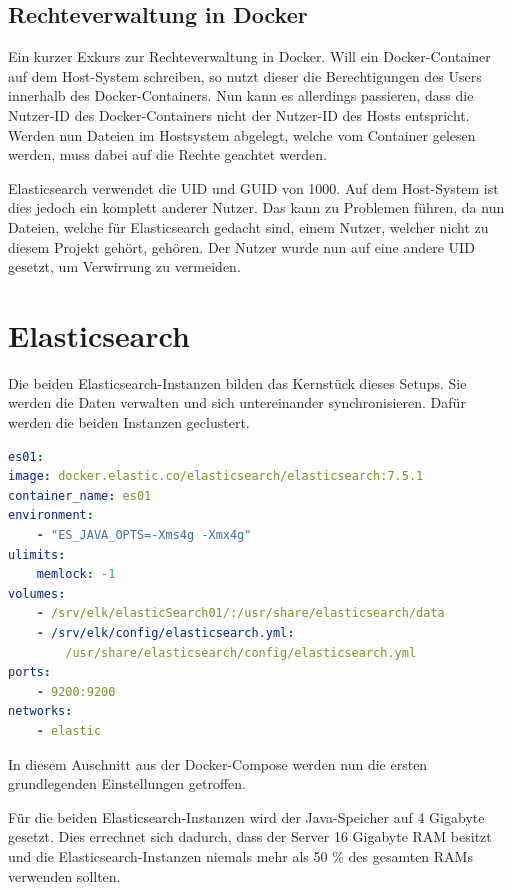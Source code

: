 \subsection{Rechteverwaltung in Docker}

Ein kurzer Exkurs zur Rechteverwaltung in Docker. Will ein Docker-Container auf dem Host-System schreiben, so nutzt dieser die Berechtigungen des Users innerhalb des Docker-Containers. Nun kann es allerdings passieren, dass die Nutzer-ID des Docker-Containers nicht der Nutzer-ID des Hosts entspricht. Werden nun Dateien im Hostsystem abgelegt, welche vom Container gelesen werden, muss dabei auf die Rechte geachtet werden. 

Elasticsearch verwendet die UID und GUID von 1000. Auf dem Host-System ist dies jedoch ein komplett anderer Nutzer. Das kann zu Problemen führen, da nun Dateien, welche für Elasticsearch gedacht sind, einem Nutzer, welcher nicht zu diesem Projekt gehört, gehören. Der Nutzer wurde nun auf eine andere UID gesetzt, um Verwirrung zu vermeiden. \cite{JarrodWeaver.2014}

\section{Elasticsearch}

Die beiden Elasticsearch-Instanzen bilden das Kernstück dieses Setups. Sie werden die Daten verwalten und sich untereinander synchronisieren. Dafür werden die beiden Instanzen geclustert.

\begin{lstlisting}[language=YAML, frame=single, label={lst:es01}, caption=Auschnitt aus der Docker-Compose Datei,captionpos=b] 
es01:
image: docker.elastic.co/elasticsearch/elasticsearch:7.5.1
container_name: es01
environment:
	- "ES_JAVA_OPTS=-Xms4g -Xmx4g"
ulimits:
	memlock: -1
volumes:
	- /srv/elk/elasticSearch01/:/usr/share/elasticsearch/data
	- /srv/elk/config/elasticsearch.yml:
		/usr/share/elasticsearch/config/elasticsearch.yml
ports:
	- 9200:9200
networks:
	- elastic
\end{lstlisting}

In diesem Auschnitt aus der Docker-Compose werden nun die ersten grundlegenden Einstellungen getroffen.

Für die beiden Elasticsearch-Instanzen wird der Java-Speicher auf 4 Gigabyte gesetzt. Dies errechnet sich dadurch, dass der Server 16 Gigabyte RAM besitzt und die Elasticsearch-Instanzen niemals mehr als 50 \% des gesamten RAMs verwenden sollten. \cite{ElasticsearchB.V..12172019}

